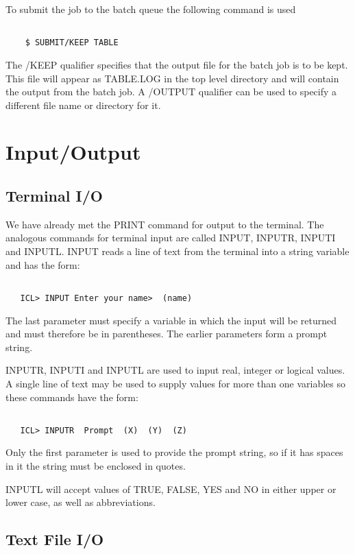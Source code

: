 To submit the job to the batch queue the following command is used
\begin{verbatim}

    $ SUBMIT/KEEP TABLE

\end{verbatim}
The /KEEP qualifier specifies that the output file for the batch job is
to be kept. This file will appear as TABLE.LOG in the top level directory
and will contain the output from the batch job. A /OUTPUT qualifier
can be used to specify a different file name or directory for it.

\chapter{Input/Output}

\section{Terminal I/O}

We have already met the PRINT command for output to the terminal. The analogous
commands for terminal input are called INPUT, INPUTR, INPUTI and INPUTL.
INPUT reads a line of text from the terminal into a string variable and
has the form:
\begin{verbatim}

   ICL> INPUT Enter your name>  (name)

\end{verbatim}
The last parameter must specify a variable in which the input will be returned
and must therefore be in parentheses. The earlier parameters form a prompt
string.

INPUTR, INPUTI and INPUTL are used to input real, integer or logical values.
A single line of text may be used to supply values for more than one variables
so these commands have the form:
\begin{verbatim}

   ICL> INPUTR  Prompt  (X)  (Y)  (Z)

\end{verbatim}
Only the first parameter is used to provide the prompt string, so if it
has spaces in it the string must be enclosed in quotes.

INPUTL will accept values of TRUE, FALSE, YES and NO in either upper or
lower case, as well as abbreviations.

\section{Text File I/O}

